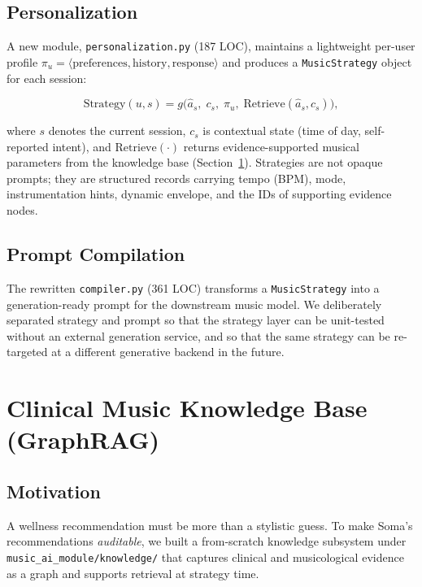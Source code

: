 \documentclass[11pt,a4paper]{article}
\begin{document}
\subsection{Personalization}

A new module, \texttt{personalization.py} (187 LOC), maintains a lightweight
per-user profile $\pi_u = \langle \text{preferences}, \text{history}, \text{response} \rangle$
and produces a \texttt{MusicStrategy} object for each session:

\[
  \text{Strategy}(u, s) = g\bigl(\hat a_s,\; c_s,\; \pi_u,\; \mathrm{Retrieve}(\hat a_s, c_s)\bigr),
\]

where $s$ denotes the current session, $c_s$ is contextual state (time of day,
self-reported intent), and $\mathrm{Retrieve}(\cdot)$ returns evidence-supported
musical parameters from the knowledge base (Section~\ref{sec:kb}). Strategies
are not opaque prompts; they are structured records carrying tempo (BPM),
mode, instrumentation hints, dynamic envelope, and the IDs of supporting
evidence nodes.

\subsection{Prompt Compilation}

The rewritten \texttt{compiler.py} (361 LOC) transforms a \texttt{MusicStrategy}
into a generation-ready prompt for the downstream music model. We deliberately
separated strategy and prompt so that the strategy layer can be unit-tested
without an external generation service, and so that the same strategy can be
re-targeted at a different generative backend in the future.

\section{Clinical Music Knowledge Base (GraphRAG)}
\label{sec:kb}

\subsection{Motivation}

A wellness recommendation must be more than a stylistic guess. To make Soma's
recommendations \emph{auditable}, we built a from-scratch knowledge subsystem
under \texttt{music\_ai\_module/knowledge/} that captures clinical and
musicological evidence as a graph and supports retrieval at strategy time.
\end{document}
